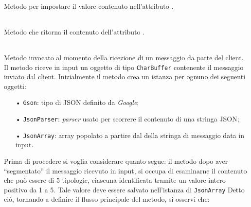 \begin{description}

	\item{}\\
	Metodo per impostare il valore contenuto nell'attributo .
	
	\item{}\\
	Metodo che ritorna il contenuto dell'attributo .
	
	\item{}\\
	Metodo invocato al momento della ricezione di un messaggio da parte del client. Il metodo riceve in input un oggetto di tipo \texttt{CharBuffer} contenente il messaggio inviato dal client.
Inizialmente il metodo crea un istanza per ognuno dei seguenti oggetti:
	\begin{itemize}
		\item[•]\texttt{Gson}: tipo di JSON definito da \textit{Google};
		\item[•]\texttt{JsonParser}: \textit{parser} usato per scorrere il contenuto di una stringa JSON;
		\item[•]\texttt{JsonArray}: array popolato a partire dal  della stringa di messaggio data in input.
	\end{itemize}
	
	Prima di procedere si voglia considerare quanto segue: il metodo dopo aver ``segmentato'' il messaggio ricevuto in input, si occupa di esaminarne il contenuto che può essere di 5 tipologie, ciascuna identificata tramite un valore intero positivo da 1 a 5. Tale valore deve essere salvato nell'istanza di \texttt{JsonArray}
	Detto ciò, tornando a definire il flusso principale del metodo, si osservi che:


\end{description}

